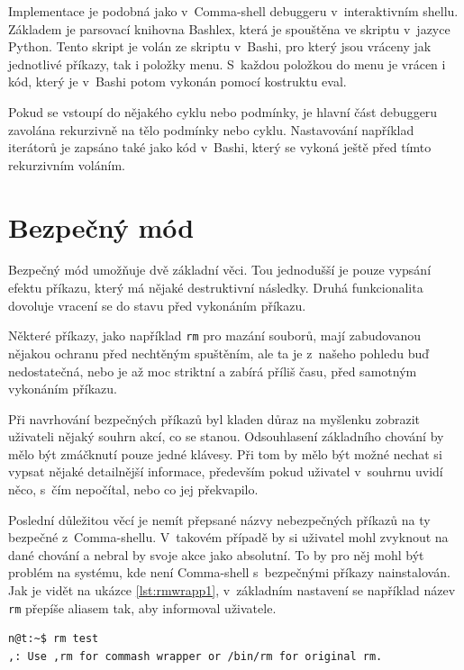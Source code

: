 \documentclass[thesis=M,czech]{FITthesis}[2012/06/26]
\begin{document}
Implementace je podobná jako v~Comma-shell debuggeru v~interaktivním shellu. Základem je parsovací knihovna Bashlex, která je spouštěna ve skriptu v~jazyce Python. Tento skript je volán ze skriptu v~Bashi, pro který jsou vráceny jak jednotlivé příkazy, tak i položky menu. S~každou položkou do menu je vrácen i kód, který je v~Bashi potom vykonán pomocí kostruktu eval.

Pokud se vstoupí do nějakého cyklu nebo podmínky, je hlavní část debuggeru zavolána rekurzivně na tělo podmínky nebo cyklu. Nastavování například iterátorů je zapsáno také jako kód v~Bashi, který se vykoná ještě před tímto rekurzivním voláním.


%
%
%
%
%
\section{Bezpečný mód}

Bezpečný mód umožňuje dvě základní věci. Tou jednodušší je pouze vypsání efektu příkazu, který má nějaké destruktivní následky. Druhá funkcionalita dovoluje vracení se do stavu před vykonáním příkazu.

Některé příkazy, jako například \texttt{rm} pro mazání souborů, mají zabudovanou nějakou ochranu před nechtěným spuštěním, ale ta je z~našeho pohledu buď nedostatečná, nebo je až moc striktní a zabírá příliš času, před samotným vykonáním příkazu.

Při navrhování bezpečných příkazů byl kladen důraz na myšlenku zobrazit uživateli nějaký souhrn akcí, co se stanou. Odsouhlasení základního chování by mělo být zmáčknutí pouze jedné klávesy. Při tom by mělo být možné nechat si vypsat nějaké detailnější informace, především pokud uživatel v~souhrnu uvidí něco, s~čím nepočítal, nebo co jej překvapilo.

Poslední důležitou věcí je nemít přepsané názvy nebezpečných příkazů na ty bezpečné z~Comma-shellu. V~takovém případě by si uživatel mohl zvyknout na dané chování a nebral by svoje akce jako absolutní. To by pro něj mohl být problém na systému, kde není Comma-shell s~bezpečnými příkazy nainstalován. Jak je vidět na ukázce \ref{lst:rmwrapp1}, v~základním nastavení se například název \texttt{rm} přepíše aliasem tak, aby informoval uživatele.

\noindent
\begin{minipage}{\linewidth}
\begin{lstlisting}[language=bash, caption={Přepsání nebezpečných příkazů}, label={lst:rmwrapp1}]
n@t:~$ rm test
,: Use ,rm for commash wrapper or /bin/rm for original rm.
\end{lstlisting}
\end{minipage}
\end{document}
